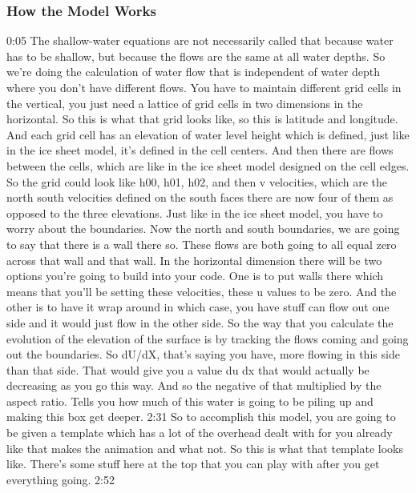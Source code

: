 \subsubsection{How the Model Works}\index{}
0:05
The shallow-water equations are not necessarily called that because water has to be shallow, but because the flows are the same at all water depths. So we're doing the calculation of water flow that is independent of water depth where you don't have different flows. You have to maintain different grid cells in the vertical, you just need a lattice of grid cells in two dimensions in the horizontal. So this is what that grid looks like, so this is latitude and longitude. And each grid cell has an elevation of water level height which is defined, just like in the ice sheet model, it's defined in the cell centers. And then there are flows between the cells, which are like in the ice sheet model designed on the cell edges. So the grid could look like h00, h01, h02, and then v velocities, which are the north south velocities defined on the south faces there are now four of them as opposed to the three elevations. Just like in the ice sheet model, you have to worry about the boundaries. Now the north and south boundaries, we are going to say that there is a wall there so. These flows are both going to all equal zero across that wall and that wall. In the horizontal dimension there will be two options you're going to build into your code. One is to put walls there which means that you'll be setting these velocities, these u values to be zero. And the other is to have it wrap around in which case, you have stuff can flow out one side and it would just flow in the other side. So the way that you calculate the evolution of the elevation of the surface is by tracking the flows coming and going out the boundaries. So dU/dX, that's saying you have, more flowing in this side than that side. That would give you a value du dx that would actually be decreasing as you go this way. And so the negative of that multiplied by the aspect ratio. Tells you how much of this water is going to be piling up and making this box get deeper. 
2:31
So to accomplish this model, you are going to be given a template which has a lot of the overhead dealt with for you already like that makes the animation and what not. So this is what that template looks like. There's some stuff here at the top that you can play with after you get everything going. 
2:52
